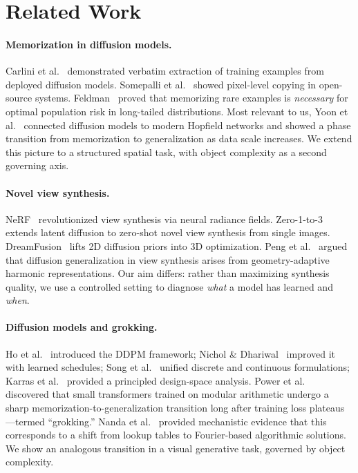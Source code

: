 \documentclass[11pt]{article}
\begin{document}
\section{Related Work}
\label{sec:related}

\paragraph{Memorization in diffusion models.}
Carlini et al.~\cite{carlini2023extracting} demonstrated verbatim extraction of
training examples from deployed diffusion models. Somepalli et
al.~\cite{somepalli2023diffusion} showed pixel-level copying in open-source
systems. Feldman~\cite{feldman2020memo} proved that memorizing rare examples is
\emph{necessary} for optimal population risk in long-tailed distributions. Most
relevant to us, Yoon et al.~\cite{yoon2025memorization} connected diffusion
models to modern Hopfield networks and showed a phase transition from
memorization to generalization as data scale increases. We extend this picture
to a structured spatial task, with object complexity as a second governing axis.

\paragraph{Novel view synthesis.}
NeRF~\cite{mildenhall2020nerf} revolutionized view synthesis via neural radiance
fields. Zero-1-to-3~\cite{liu2023zero} extends latent diffusion to zero-shot
novel view synthesis from single images. DreamFusion~\cite{poole2022dreamfusion}
lifts 2D diffusion priors into 3D optimization. Peng et
al.~\cite{peng2024generalization} argued that diffusion generalization in view
synthesis arises from geometry-adaptive harmonic representations. Our aim
differs: rather than maximizing synthesis quality, we use a controlled setting
to diagnose \emph{what} a model has learned and \emph{when}.

\paragraph{Diffusion models and grokking.}
Ho et al.~\cite{ho2020ddpm} introduced the DDPM framework; Nichol \&
Dhariwal~\cite{nichol2021improved} improved it with learned schedules; Song et
al.~\cite{song2021sde} unified discrete and continuous formulations; Karras et
al.~\cite{karras2022edm} provided a principled design-space analysis. Power et
al.~\cite{power2022grokking} discovered that small transformers trained on
modular arithmetic undergo a sharp memorization-to-generalization transition
long after training loss plateaus---termed ``grokking.'' Nanda et
al.~\cite{nanda2023progress} provided mechanistic evidence that this corresponds
to a shift from lookup tables to Fourier-based algorithmic solutions. We show an
analogous transition in a visual generative task, governed by object complexity.
\end{document}
